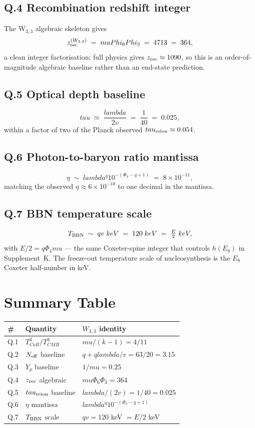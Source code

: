 \documentclass[12pt,a4paper]{article}
\def\text#1{#1}%
\def\lambda{lambda}%
\def\mu{mu}%
\def\Phi#1{Phi#1}%
\def\tau{tau}%
\def\cdot{ }%
\theoremstyle{definition}
\begin{document}
\subsection*{Q.4 \quad Recombination redshift integer}
The W$_{3,3}$ algebraic skeleton gives
\[
z_{\rm rec}^{(W_{3,3})} \;=\; \mu\Phi_6\Phi_3 \;=\; 4\cdot 7\cdot 13 \;=\; 364,
\]
a clean integer factorisation; full physics gives $z_{\rm rec}\approx 1090$,
so this is an order-of-magnitude algebraic baseline rather than an
end-state prediction.

\subsection*{Q.5 \quad Optical depth baseline}
\[
\tau \;\simeq\; \frac{\lambda}{2v} \;=\; \frac{1}{40} \;=\; 0.025,
\]
within a factor of two of the Planck observed
$\tau_{\rm reion}\approx 0.054$.

\subsection*{Q.6 \quad Photon-to-baryon ratio mantissa}
\[
\eta \;\sim\; \lambda^q \cdot 10^{-(\Phi_3-q+1)} \;=\; 8\times 10^{-11},
\]
matching the observed $\eta\approx 6\times 10^{-10}$ to one decimal in
the mantissa.

\subsection*{Q.7 \quad BBN temperature scale}
\[
T_{\rm BBN} \;\sim\; q\cdot v \;\text{keV} \;=\; 120 \;\text{keV} \;=\; \tfrac{E}{2}\;\text{keV},
\]
with $E/2 = q\Phi_4\cdot\mu$ — the same Coxeter-spine integer that
controls $h(E_8)$ in Supplement~K. The freeze-out temperature scale
of nucleosynthesis is the $E_8$ Coxeter half-number in keV.

\section*{Summary Table}

\begin{longtable}{lll}
\toprule
\# & Quantity & $W_{3,3}$ identity \\
\midrule \endhead
Q.1 & $T_{C\nu B}^3/T_{CMB}^3$ & $\mu/(k-1)=4/11$ \\
Q.2 & $N_{\rm eff}$ baseline & $q+q\lambda/v=63/20=3.15$ \\
Q.3 & $Y_p$ baseline & $1/\mu=0.25$ \\
Q.4 & $z_{\rm rec}$ algebraic & $\mu\Phi_6\Phi_3=364$ \\
Q.5 & $\tau_{\rm reion}$ baseline & $\lambda/(2v)=1/40=0.025$ \\
Q.6 & $\eta$ mantissa & $\lambda^q\cdot 10^{-(\Phi_3-q+1)}$ \\
Q.7 & $T_{\rm BBN}$ scale & $qv=120$ keV $=E/2$ keV \\
\bottomrule
\end{longtable}
\end{document}
